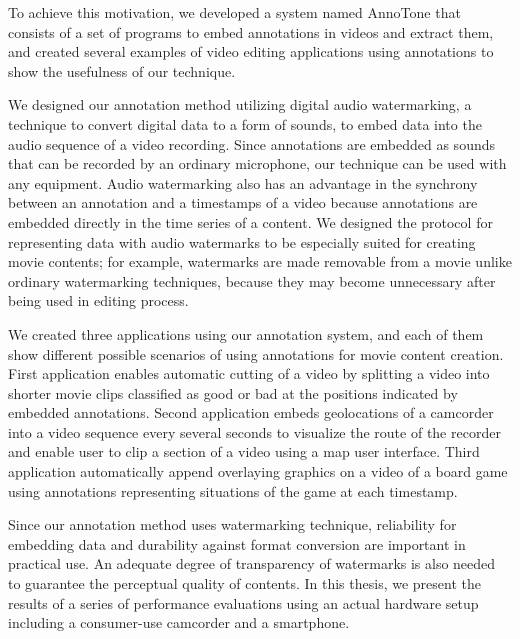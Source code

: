To achieve this motivation, we developed a system named AnnoTone that consists of a set of programs to embed annotations in videos and extract them, and created several examples of video editing applications using annotations to show the usefulness of our technique.

We designed our annotation method utilizing digital audio watermarking, a technique to convert digital data to a form of sounds, to embed data into the audio sequence of a video recording.
Since annotations are embedded as sounds that can be recorded by an ordinary microphone, our technique can be used with any equipment. %
Audio watermarking also has an advantage in the synchrony between an annotation and a timestamps of a video because annotations are embedded directly in the time series of a content.
We designed the protocol for representing data with audio watermarks to be especially suited for creating movie contents;
for example, watermarks are made removable from a movie unlike ordinary watermarking techniques, because they may become unnecessary after being used in editing process.

We created three applications using our annotation system, and each of them show different possible scenarios of using annotations for movie content creation.
First application enables automatic cutting of a video by splitting a video into shorter movie clips classified as good or bad at the positions indicated by embedded annotations.
Second application embeds geolocations of a camcorder into a video sequence every several seconds to visualize the route of the recorder and enable user to clip a section of a video using a map user interface.
Third application automatically append overlaying graphics on a video of a board game using annotations representing situations of the game at each timestamp.

Since our annotation method uses watermarking technique, reliability for embedding data and durability against format conversion are important in practical use.
An adequate degree of transparency of watermarks is also needed to guarantee the perceptual quality of contents.
In this thesis, we present the results of a series of performance evaluations using an actual hardware setup including a consumer-use camcorder and a smartphone.